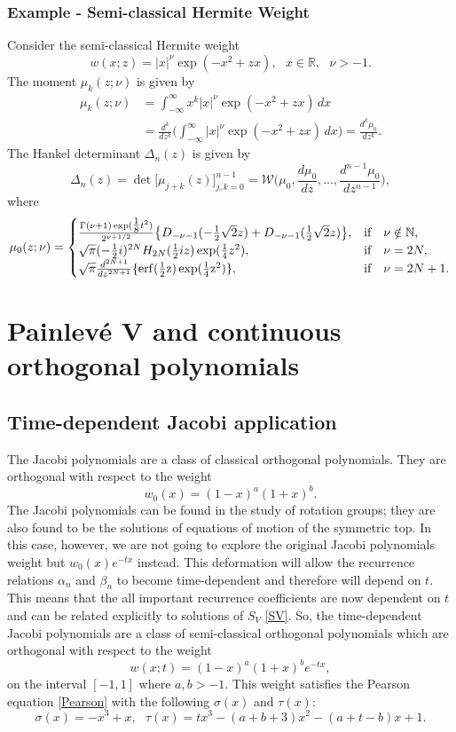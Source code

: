 \documentclass[12pt]{article}
\def\P{Painlev\'e }
\def\N{\mathbb{N}}
\def\R{\mathbb{R}}
\numberwithin{figure}{section}
\numberwithin{equation}{section}
\numberwithin{table}{section}
\begin{document}
\subsubsection{Example - Semi-classical Hermite Weight}
Consider the semi-classical Hermite weight \cite{P:PAC&KJ}
$$w(x;z)=|x|^\nu\exp(-x^2+zx),~~~x\in\R,~~~\nu>-1.$$
The moment $\mu_k(z;\nu)$ is given by
\begin{align}
\mu_k(z;\nu)&=\int^\infty_{-\infty}x^k|x|^\nu\exp(-x^2+zx)\,dx\\
&=\frac{d^k}{dz^k}\bigg(\int^\infty_{-\infty}|x|^\nu\exp(-x^2+zx)\,dx\bigg)=\frac{d^k\mu_0}{dz^k}.
\end{align}
The Hankel determinant $\Delta_n(z)$ is given by
$$\Delta_n(z)=\det\big[\mu_{j+k}(z)\big]^{n-1}_{j,k=0}=\mathcal{W}\bigg(\mu_0,\frac{d\mu_0}{dz},\hdots,\frac{d^{n-1}\mu_0}{dz^{n-1}}\bigg),$$
where
$$
\mu_{0}(z;\nu)=\begin{cases}
\frac{\Gamma(\nu+1)\exp(\tfrac{1}{8}t^2)}{2^{{\nu+1}/2}}\big\{D_{-\nu-1}(-\tfrac{1}{2}\sqrt{2}z)+D_{-\nu-1}(\tfrac{1}{2}\sqrt{2}z)\big\},&\mbox{\rm if}\quad \nu\notin\N,\\
\sqrt{\pi}(-\tfrac{1}{2}i)^{2N}H_{2N}(\tfrac{1}{2}iz)\exp(\tfrac{1}{4}z^2),&\mbox{\rm if}\quad \nu=2N,\\
\sqrt{\pi}\frac{d^{2N+1}}{dz^{2N+1}}\{\rm{erf}(\tfrac{1}{2}z)\exp(\tfrac{1}{4}z^2)\},&\mbox{\rm if}\quad \nu=2N+1.\\
\end{cases}
$$
\newpage\section{\P V and continuous orthogonal polynomials}
\subsection{Time-dependent Jacobi application}
The Jacobi polynomials are a class of classical orthogonal polynomials. They are orthogonal with respect to the weight
\begin{equation}
w_0(x)=(1-x)^ a(1+x)^ b.\nonumber
\end{equation}
The Jacobi polynomials can be found in the study of rotation groups; they are also found to be the solutions of equations of motion of the symmetric top.
In this case, however, we are not going to explore the original Jacobi polynomials weight but $w_0(x)e^{-tx}$ instead. This deformation will allow the
recurrence relations $\alpha_n$ and $\beta_n$ to become time-dependent and therefore will depend on $t$. This means that the all important recurrence coefficients are now dependent on $t$ and can be related explicitly to solutions of $S_V$ \eqref{SV}.
So, the time-dependent Jacobi polynomials are a class of semi-classical orthogonal polynomials which are orthogonal with respect to the weight
\begin{equation}
w(x;t)=(1-x)^ a(1+x)^ b e^{-tx},\label{weight1}
\end{equation}
on the interval $[-1,1]$ where $ a, b>-1$. This weight satisfies the Pearson equation \eqref{Pearson} with the following $\sigma(x)$ and $\tau(x)$:
$$\sigma(x)=-{x}^{3}+x,~~~\tau(x)=t{x}^{3}-( a+b+3) {x}^{2}-(a+t-b) x+1.$$
\end{document}
